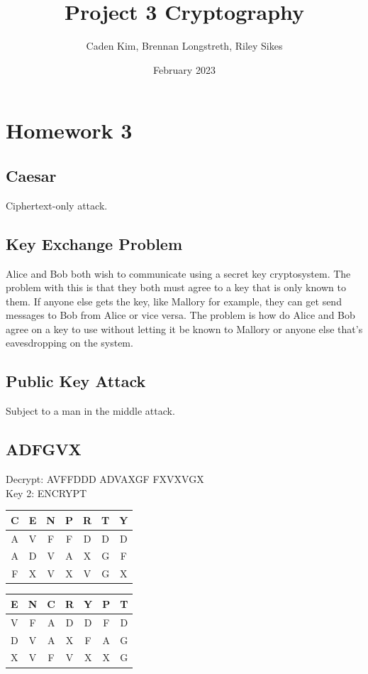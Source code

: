 \documentclass{article}
\title{Project 3 Cryptography}
\author{Caden Kim, Brennan Longstreth, Riley Sikes }
\date{February 2023}
\begin{document}
\maketitle

\section{Homework 3}

\subsection{Caesar}

Ciphertext-only attack.

\subsection{Key Exchange Problem}

Alice and Bob both wish to communicate using a secret key cryptosystem. The problem with this is that they both must agree to a key that is only known to them. If anyone else gets the key, like Mallory for example, they can get send messages to Bob from Alice or vice versa. The problem is how do Alice and Bob agree on a key to use without letting it be known to Mallory or anyone else that's eavesdropping on the system.

\subsection{Public Key Attack}

Subject to a man in the middle attack.

\subsection{ADFGVX}
Decrypt: AVFFDDD ADVAXGF FXVXVGX \\

Key 2: ENCRYPT \\
\begin{center}
\begin{tabular}{ c c c c c c c }
    C & E & N & P & R & T & Y \\ [0.5ex] 
    \hline
    A & V & F & F & D & D & D \\
    A & D & V & A & X & G & F \\
    F & X & V & X & V & G & X \\
\end{tabular}
\end{center}
\begin{center}
\begin{tabular}{ c c c c c c c }
    E & N & C & R & Y & P & T \\ [0.5ex] 
    \hline
    V & F & A & D & D & F & D \\
    D & V & A & X & F & A & G \\
    X & V & F & V & X & X & G \\
\end{tabular}
\end{center}
\end{document}
